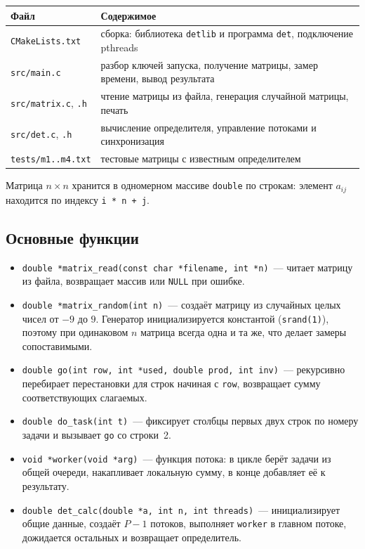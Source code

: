 \documentclass[pdf, unicode, 12pt, a4paper, oneside, fleqn]{article}
\begin{document}
\begin{center}
\begin{tabular}{|l|p{11cm}|}
\hline
\textbf{Файл} & \textbf{Содержимое} \\ \hline
\texttt{CMakeLists.txt} & сборка: библиотека \texttt{detlib} и программа \texttt{det}, подключение pthreads \\ \hline
\texttt{src/main.c} & разбор ключей запуска, получение матрицы, замер времени, вывод результата \\ \hline
\texttt{src/matrix.c}, \texttt{.h} & чтение матрицы из файла, генерация случайной матрицы, печать \\ \hline
\texttt{src/det.c}, \texttt{.h} & вычисление определителя, управление потоками и синхронизация \\ \hline
\texttt{tests/m1..m4.txt} & тестовые матрицы с известным определителем \\ \hline
\end{tabular}
\end{center}

Матрица $n \times n$ хранится в одномерном массиве \texttt{double} по строкам:
элемент $a_{ij}$ находится по индексу \texttt{i * n + j}.

\subsection*{Основные функции}

\begin{itemize}
    \item \texttt{double *matrix\_read(const char *filename, int *n)}~--- читает матрицу из файла, возвращает массив или \texttt{NULL} при ошибке.
    \item \texttt{double *matrix\_random(int n)}~--- создаёт матрицу из случайных целых
          чисел от $-9$ до $9$. Генератор инициализируется константой (\texttt{srand(1)}),
          поэтому при одинаковом $n$ матрица всегда одна и та же, что делает замеры
          сопоставимыми.
    \item \texttt{double go(int row, int *used, double prod, int inv)}~--- рекурсивно
          перебирает перестановки для строк начиная с \texttt{row}, возвращает сумму
          соответствующих слагаемых.
    \item \texttt{double do\_task(int t)}~--- фиксирует столбцы первых двух строк
          по номеру задачи и вызывает \texttt{go} со строки~2.
    \item \texttt{void *worker(void *arg)}~--- функция потока: в цикле берёт задачи
          из общей очереди, накапливает локальную сумму, в конце добавляет её к результату.
    \item \texttt{double det\_calc(double *a, int n, int threads)}~--- инициализирует общие
          данные, создаёт $P-1$ потоков, выполняет \texttt{worker} в главном потоке,
          дожидается остальных и возвращает определитель.
\end{itemize}
\end{document}
